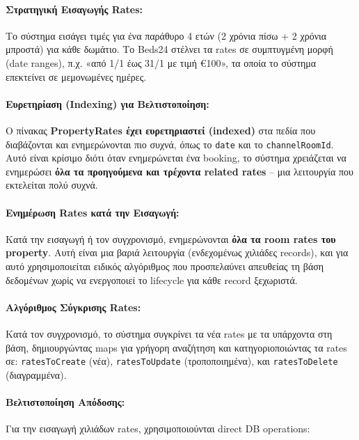 \documentclass[
	12pt, %
	oneside, %
	greek,
	onehalfspacing, %
	liststotoc, %
	toctotoc, %
	parskip, %
	headsepline, %
]{MastersDoctoralThesis} %
\newcommand{\code}[1]{\texttt{#1}}
\begin{document}
\paragraph{Στρατηγική Εισαγωγής Rates:}

Το σύστημα εισάγει τιμές για ένα παράθυρο 4 ετών (2 χρόνια πίσω + 2 χρόνια μπροστά) για κάθε δωμάτιο. Το Beds24 στέλνει τα rates σε συμπτυγμένη μορφή (date ranges), π.χ. «από 1/1 έως 31/1 με τιμή €100», τα οποία το σύστημα επεκτείνει σε μεμονωμένες ημέρες.

\paragraph{Ευρετηρίαση (Indexing) για Βελτιστοποίηση:}

Ο πίνακας \textbf{PropertyRates έχει ευρετηριαστεί (indexed)} στα πεδία που διαβάζονται και ενημερώνονται πιο συχνά, όπως το \code{date} και το \code{channelRoomId}. Αυτό είναι κρίσιμο διότι όταν ενημερώνεται ένα booking, το σύστημα χρειάζεται να ενημερώσει \textbf{όλα τα προηγούμενα και τρέχοντα related rates} -- μια λειτουργία που εκτελείται πολύ συχνά.

\paragraph{Ενημέρωση Rates κατά την Εισαγωγή:}

Κατά την εισαγωγή ή τον συγχρονισμό, ενημερώνονται \textbf{όλα τα room rates του property}. Αυτή είναι μια βαριά λειτουργία (ενδεχομένως χιλιάδες records), και για αυτό χρησιμοποιείται ειδικός αλγόριθμος που προσπελαύνει απευθείας τη βάση δεδομένων χωρίς να ενεργοποιεί το lifecycle για κάθε record ξεχωριστά.

\paragraph{Αλγόριθμος Σύγκρισης Rates:}

Κατά τον συγχρονισμό, το σύστημα συγκρίνει τα νέα rates με τα υπάρχοντα στη βάση, δημιουργώντας maps για γρήγορη αναζήτηση και κατηγοριοποιώντας τα rates σε: \code{ratesToCreate} (νέα), \code{ratesToUpdate} (τροποποιημένα), και \code{ratesToDelete} (διαγραμμένα).

\paragraph{Βελτιστοποίηση Απόδοσης:}

Για την εισαγωγή χιλιάδων rates, χρησιμοποιούνται direct DB operations:
\end{document}

